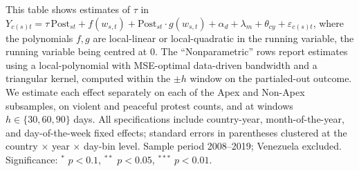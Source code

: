 \documentclass[11pt]{article}
\begin{document}
\begin{table}[htb!]
    \caption{Regression discontinuity in event time: jump at disclosure.}
    \label{tab:sup_rd_time}
    \begin{center}
        \scriptsize{}
    \end{center}
    \footnotesize{This table shows estimates of $\tau$ in $Y_{c(s)t} = \tau\,\text{Post}_{st} + f(w_{s,t}) + \text{Post}_{st}\cdot g(w_{s,t}) + \alpha_d + \lambda_m + \theta_{cy} + \varepsilon_{c(s)t}$, where the polynomials $f,g$ are local-linear or local-quadratic in the running variable, the running variable being centred at $0$. The ``Nonparametric'' rows report estimates using a local-polynomial with MSE-optimal data-driven bandwidth and a triangular kernel, computed within the $\pm h$ window on the partialed-out outcome. We estimate each effect separately on each of the Apex and Non-Apex subsamples, on violent and peaceful protest counts, and at windows $h\in\{30,60,90\}$ days. All specifications include country-year, month-of-the-year, and day-of-the-week fixed effects; standard errors in parentheses clustered at the country $\times$ year $\times$ day-bin level. Sample period 2008--2019; Venezuela excluded. Significance: $^{*}$ $p<0.1$, $^{**}$ $p<0.05$, $^{***}$ $p<0.01$.}
\end{table}
\end{document}
